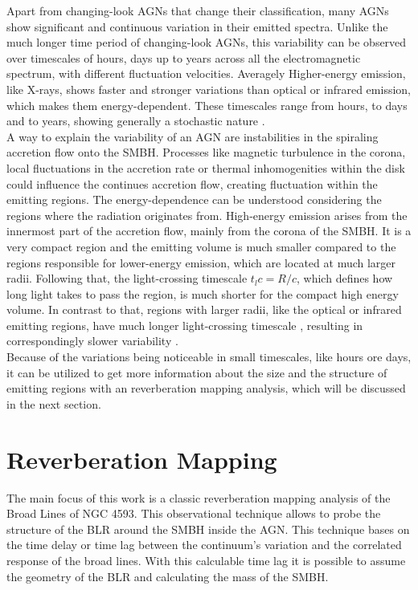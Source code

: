 Apart from changing-look AGNs that change their classification, many AGNs show significant and continuous variation in their emitted spectra. Unlike the much longer time period of changing-look AGNs, this variability can be observed over timescales of hours, days up to years across all the electromagnetic spectrum, with different fluctuation velocities. Averagely Higher-energy emission, like X-rays, shows faster and stronger variations than optical or infrared emission, which makes them energy-dependent. These timescales range from hours, to days and to years, showing generally a stochastic nature \parencite{Ulrich1997}.\\ 
A way to explain the variability of an AGN are instabilities in the spiraling accretion flow onto the SMBH. Processes like magnetic turbulence in the corona, local fluctuations in the accretion rate or thermal inhomogenities within the disk could influence the continues accretion flow, creating fluctuation within the emitting regions. The energy-dependence can be understood considering the regions where the radiation originates from. High-energy emission arises from the innermost part of the accretion flow, mainly from the corona of the SMBH. It is a very compact region and the emitting volume is much smaller compared to the regions responsible for lower-energy emission, which are located at much larger radii. Following that, the light-crossing timescale $t_lc = R/c$, which defines how long light takes to pass the region, is much shorter for the compact high energy volume. In contrast to that, regions with larger radii, like the optical or infrared emitting regions, have much longer light-crossing timescale , resulting in correspondingly slower variability \parencite{Ulrich1997, McHardy2006}.\\
Because of the variations being noticeable in small timescales, like hours ore days, it can be utilized to get more information about the size and the structure of emitting regions with an reverberation mapping analysis, which will be discussed in the next section.



\section{Reverberation Mapping}
\label{sec:reverberation_mapping}

The main focus of this work is a classic reverberation mapping analysis of the Broad Lines of NGC 4593. This observational technique allows to probe the structure of the BLR around the SMBH inside the AGN. This technique bases on the time delay or time lag between the continuum's variation and the correlated response of the broad lines. With this calculable time lag it is possible to assume the geometry of the BLR and calculating the mass of the SMBH.  


